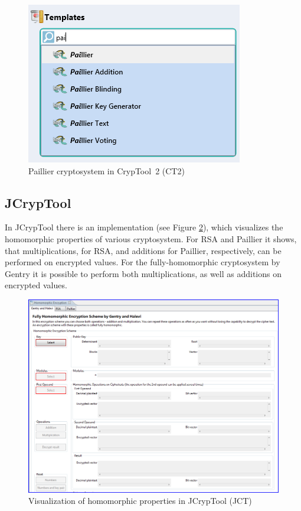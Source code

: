 \begin{bibunit}[babalpha]
\begin{figure}[ht]
\begin{center}
\includegraphics[scale=0.8]{figures/CT2-Paillier.png}
	\caption{Paillier cryptosystem in CrypTool~2 (CT2)} 
\label{CT2-Paillier}
\end{center}
\end{figure}

\newpage
\subsection{JCrypTool}

In JCrypTool there is an implementation (see Figure \ref{JCT-HomEnc}), which visualizes the homomorphic properties of various cryptosystem. For RSA and Paillier it shows, that multiplications, for RSA, and additions for Paillier, respectively, can be performed on encrypted values. For the fully-homomorphic cryptosystem by Gentry it is possible to perform both multiplications, as well as additions on encrypted values.

\begin{figure}[ht]
\begin{center}
\includegraphics[scale=0.4]{figures/JCT-HomEnc.PNG}
	\caption{Visualization of homomorphic properties in JCrypTool (JCT)} 
\label{JCT-HomEnc}
\end{center}
\end{figure}




\end{bibunit}
